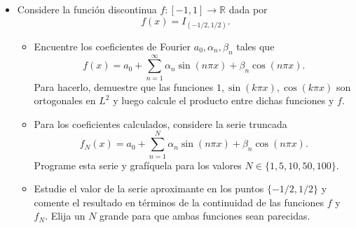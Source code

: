 \documentclass[9pt]{article}
\newcommand{\R}{\mathbb{R}}
\newcommand{\pts}[1]{[{\bf #1 puntos}] }
\begin{document}
\begin{itemize}
\begin{enumerate}
        \end{enumerate}
    \item Considere la función discontinua $f:[-1,1]\to \R$ dada por
            $$ f(x) = I_{(-1/2,1/2)}. $$
            \begin{itemize}
                \item\pts{2} Encuentre los coeficientes de Fourier $a_0, \alpha_n, \beta_n$ tales que 
                    $$ f(x) = a_0 + \sum_{n=1}^\infty \alpha_n \sin(n\pi x) + \beta_n \cos(n\pi x). $$
                    Para hacerlo, demuestre que las funciones $1,\sin(k\pi x), \cos(k\pi x)$ son ortogonales en $L^2$ y luego calcule el producto entre dichas funciones y $f$.
                \item\pts{3} Para los coeficientes calculados, considere la serie truncada
                    $$ f_N(x) = a_0 + \sum_{n=1}^N \alpha_n \sin(n\pi x) + \beta_n \cos(n\pi x). $$
                    Programe esta serie y grafíquela para los valores $N\in \{1,5,10,50,100\}$.
                \item\pts{2} Estudie el valor de la serie aproximante en los puntos $\{-1/2,1/2\}$ y comente el resultado en términos de la continuidad de las funciones $f$ y $f_N$. Elija un $N$ grande para que ambas funciones sean parecidas. 
            \end{itemize}
\end{itemize} %

\vspace{1cm}
\end{document}
